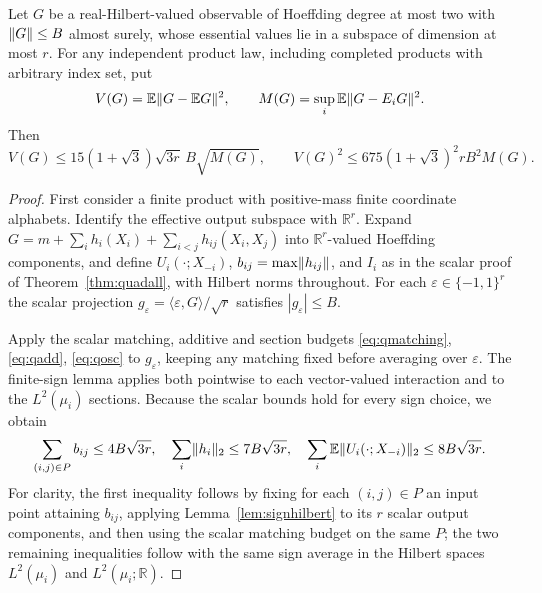 \begin{theorem}\label{thm:rank-influence}
Let $G$ be a real-Hilbert-valued observable of Hoeffding degree at most two with $\lVert G\rVert\le B$ almost surely, whose essential values lie in a subspace of dimension at most $r$. For any independent product law, including completed products with arbitrary index set, put
\[
 V(G)=\mathbb E\lVert G-\mathbb E G\rVert^2,\qquad
 M(G)=\sup_i\mathbb E\lVert G-E_iG\rVert^2.
\]
Then
\begin{equation}\label{eq:vectorinfluence}
 V(G)\le15(1+\sqrt3)\sqrt{3r}\,B\sqrt{M(G)},\qquad
 V(G)^2\le675(1+\sqrt3)^2rB^2M(G).
\end{equation}
\end{theorem}
\begin{proof}
First consider a finite product with positive-mass finite coordinate alphabets. Identify the effective output subspace with $\mathbb R^r$. Expand
$G=m+\sum_i h_i(X_i)+\sum_{i<j}h_{ij}(X_i,X_j)$
into $\mathbb R^r$-valued Hoeffding components, and define $U_i(\cdot;X_{-i})$, $b_{ij}=\max\lVert h_{ij}\rVert$, and $I_i$ as in the scalar proof of Theorem~\ref{thm:quadall}, with Hilbert norms throughout. For each $\varepsilon\in\{-1,1\}^r$ the scalar projection
$g_\varepsilon=\langle\varepsilon,G\rangle/\sqrt r$ satisfies $|g_\varepsilon|\le B$.

Apply the scalar matching, additive and section budgets \eqref{eq:qmatching}, \eqref{eq:qadd}, \eqref{eq:qosc} to $g_\varepsilon$, keeping any matching fixed before averaging over $\varepsilon$. The finite-sign lemma applies both pointwise to each vector-valued interaction and to the $L^2(\mu_i)$ sections. Because the scalar bounds hold for every sign choice, we obtain
\begin{equation}\label{eq:vectorbudgets}
 \sum_{(i,j)\in P}b_{ij}\le4B\sqrt{3r},\quad
 \sum_i\lVert h_i\rVert_2\le7B\sqrt{3r},\quad
 \sum_i\mathbb E\lVert U_i(\cdot;X_{-i})\rVert_2\le8B\sqrt{3r}.
\end{equation}
For clarity, the first inequality follows by fixing for each $(i,j)\in P$ an input point attaining $b_{ij}$, applying Lemma~\ref{lem:signhilbert} to its $r$ scalar output components, and then using the scalar matching budget on the same $P$; the two remaining inequalities follow with the same sign average in the Hilbert spaces $L^2(\mu_i)$ and $L^2(\mu_i;\mathbb R)$.


\end{proof}

